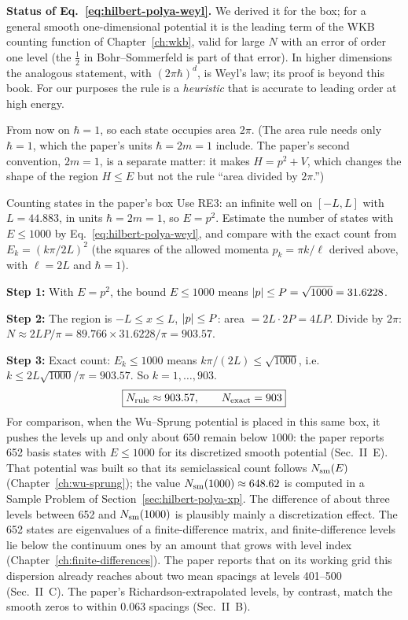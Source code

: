 \begin{beyond}
\textbf{Status of Eq.~\eqref{eq:hilbert-polya-weyl}.} We derived it for the box; for a general smooth one-dimensional potential it is the leading term of the WKB counting function of Chapter~\ref{ch:wkb}, valid for large $N$ with an error of order one level (the $\tfrac12$ in Bohr--Sommerfeld is part of that error). In higher dimensions the analogous statement, with $(2\pi\hbar)^d$, is Weyl's law; its proof is beyond this book. For our purposes the rule is a \emph{heuristic} that is accurate to leading order at high energy.
\end{beyond}

From now on $\hbar=1$, so each state occupies area $2\pi$. (The area rule needs only $\hbar=1$, which the paper's units $\hbar=2m=1$ include. The paper's second convention, $2m=1$, is a separate matter: it makes $H=p^2+V$, which changes the shape of the region $H\le E$ but not the rule ``area divided by $2\pi$.'')

\begin{sample}{Counting states in the paper's box}
Use RE3: an infinite well on $[-L,L]$ with $L=44.883$, in units $\hbar=2m=1$, so $E=p^2$. Estimate the number of states with $E\le1000$ by Eq.~\eqref{eq:hilbert-polya-weyl}, and compare with the exact count from $E_k=(k\pi/2L)^2$ (the squares of the allowed momenta $p_k=\pi k/\ell$ derived above, with $\ell=2L$ and $\hbar=1$).

\textbf{Step 1:} With $E=p^2$, the bound $E\le1000$ means $\left\lvert p\right\rvert\le P=\sqrt{1000}=31.6228$.

\textbf{Step 2:} The region is $-L\le x\le L$, $\left\lvert p\right\rvert\le P$: area $=2L\cdot2P=4LP$. Divide by $2\pi$: $N\approx 2LP/\pi=89.766\times31.6228/\pi=903.57$.

\textbf{Step 3:} Exact count: $E_k\le1000$ means $k\pi/(2L)\le\sqrt{1000}$, i.e. $k\le 2L\sqrt{1000}/\pi=903.57$. So $k=1,\dots,903$.
\[
\boxed{N_{\rm rule}\approx903.57,\qquad N_{\rm exact}=903}
\]
For comparison, when the Wu--Sprung potential is placed in this same box, it pushes the levels up and only about $650$ remain below $1000$: the paper reports 652 basis states with $E\le1000$ for its discretized smooth potential (Sec.~II~E). That potential was built so that its semiclassical count follows $N_{\mathrm{sm}}(E)$ (Chapter~\ref{ch:wu-sprung}); the value $N_{\mathrm{sm}}(1000)\approx648.62$ is computed in a Sample Problem of Section~\ref{sec:hilbert-polya-xp}. The difference of about three levels between 652 and $N_{\mathrm{sm}}(1000)$ is plausibly mainly a discretization effect. The 652 states are eigenvalues of a finite-difference matrix, and finite-difference levels lie below the continuum ones by an amount that grows with level index (Chapter~\ref{ch:finite-differences}). The paper reports that on its working grid this dispersion already reaches about two mean spacings at levels 401--500 (Sec.~II~C). The paper's Richardson-extrapolated levels, by contrast, match the smooth zeros to within $0.063$ spacings (Sec.~II~B).
\end{sample}

